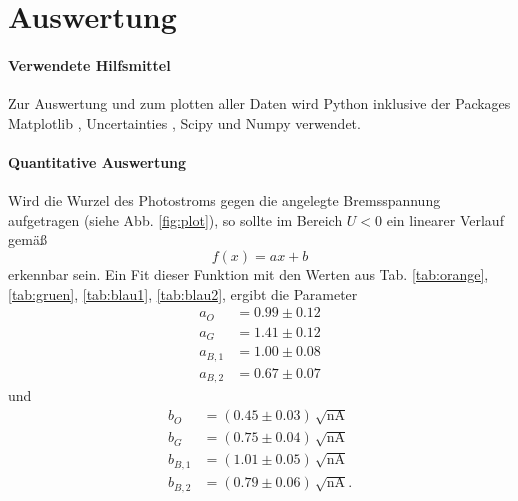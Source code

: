 \section{Auswertung}
\label{sec:Auswertung}
\paragraph{Verwendete Hilfsmittel}
Zur Auswertung und zum plotten aller Daten wird Python \cite{python} inklusive der Packages Matplotlib \cite{matplotlib}, Uncertainties \cite{uncertainties}, Scipy \cite{scipy} und Numpy \cite{numpy} verwendet.

\paragraph{Quantitative Auswertung}
Wird die Wurzel des Photostroms gegen die angelegte Bremsspannung aufgetragen (siehe Abb. \ref{fig:plot}), so sollte im Bereich $U < 0$ ein linearer Verlauf gemäß
\begin{equation}
  f(x) = ax+b
  \label{eqn:lin}
\end{equation}
erkennbar sein. Ein Fit dieser Funktion mit den Werten aus Tab. \ref{tab:orange}, \ref{tab:gruen}, \ref{tab:blau1}, \ref{tab:blau2}, ergibt die Parameter
\begin{align*}
  a_O &= 0.99 \pm 0.12\\
  a_G &= 1.41 \pm 0.12 \\
  a_{B,1} &= 1.00 \pm 0.08 \\
  a_{B,2} &= 0.67 \pm 0.07
\end{align*}
und
\begin{align*}
  b_O &= (0.45 \pm 0.03) \, \sqrt{\si{\nano \ampere}} \\
  b_G &= (0.75 \pm 0.04) \, \sqrt{\si{\nano \ampere}} \\
  b_{B,1} &= (1.01 \pm 0.05) \, \sqrt{\si{\nano \ampere}} \\
  b_{B,2} &= (0.79 \pm 0.06) \, \sqrt{\si{\nano \ampere}}.
\end{align*}

